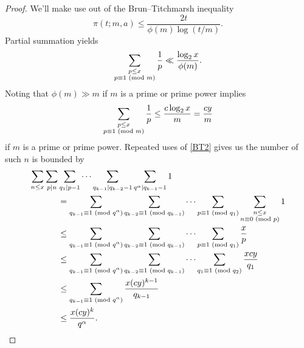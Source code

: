 \documentclass[12pt,regno]{amsart}
\begin{document}
\begin{proof}
We'll make use out of the Brun--Titchmarsh inequality
$$\pi(t;m,a)\le \frac{2t}{\phi(m)\log(t/m)}.$$ Partial summation yields
\begin{equation}\label{BT}
\sum_{\substack{p \le x \\ p \equiv 1 {{\ifmmode\text{\rm\ (mod~${m}$)}\else\discretionary{}{}{\hbox{ }}\rm(mod~${m}$)\fi}}}}\frac{1}{p} \ll \frac{\log_2 x}{\phi(m)}.
\end{equation} Noting that $\phi(m) \gg m$ if $m$ is a prime or prime power implies
\begin{equation}\label{BT2}
\sum_{\substack{p \le x \\ p \equiv 1 {{\ifmmode\text{\rm\ (mod~${m}$)}\else\discretionary{}{}{\hbox{ }}\rm(mod~${m}$)\fi}}}}\frac{1}{p} \le \frac{c\log_2 x}{m} = \frac{cy}{m}
\end{equation} if $m$ is a prime or prime power. Repeated uses of \eqref{BT2} gives us the number of such $n$ is bounded by
\begin{align*}
\sum_{n \le x}\sum_{p \mid n}& \sum_{q_1 \mid p-1}\dots \sum_{q_{k-1} \mid q_{k-2}-1}\sum_{q^{\alpha} \mid q_{k-1}-1}1 \\ & = \sum_{q_{k-1}\equiv 1{{\ifmmode\text{\rm\ (mod~${q^{\alpha}}$)}\else\discretionary{}{}{\hbox{ }}\rm(mod~${q^{\alpha}}$)\fi}}}\sum_{q_{k-2}\equiv 1{{\ifmmode\text{\rm\ (mod~${q_{k-1}}$)}\else\discretionary{}{}{\hbox{ }}\rm(mod~${q_{k-1}}$)\fi}}}\dots\sum_{p \equiv 1 {{\ifmmode\text{\rm\ (mod~${q_1}$)}\else\discretionary{}{}{\hbox{ }}\rm(mod~${q_1}$)\fi}}}\sum_{\substack{n \le x \\ n \equiv 0 {{\ifmmode\text{\rm\ (mod~${p}$)}\else\discretionary{}{}{\hbox{ }}\rm(mod~${p}$)\fi}}}}1 \\
& \le \sum_{q_{k-1}\equiv 1{{\ifmmode\text{\rm\ (mod~${q^{\alpha}}$)}\else\discretionary{}{}{\hbox{ }}\rm(mod~${q^{\alpha}}$)\fi}}}\sum_{q_{k-2}\equiv 1{{\ifmmode\text{\rm\ (mod~${q_{k-1}}$)}\else\discretionary{}{}{\hbox{ }}\rm(mod~${q_{k-1}}$)\fi}}}\dots\sum_{p \equiv 1 {{\ifmmode\text{\rm\ (mod~${q_1}$)}\else\discretionary{}{}{\hbox{ }}\rm(mod~${q_1}$)\fi}}}\frac{x}{p} \\
& \le \sum_{q_{k-1}\equiv 1{{\ifmmode\text{\rm\ (mod~${q^{\alpha}}$)}\else\discretionary{}{}{\hbox{ }}\rm(mod~${q^{\alpha}}$)\fi}}}\sum_{q_{k-2}\equiv 1{{\ifmmode\text{\rm\ (mod~${q_{k-1}}$)}\else\discretionary{}{}{\hbox{ }}\rm(mod~${q_{k-1}}$)\fi}}}\dots\sum_{q_1 \equiv 1 {{\ifmmode\text{\rm\ (mod~${q_2}$)}\else\discretionary{}{}{\hbox{ }}\rm(mod~${q_2}$)\fi}}}\frac{xcy}{q_1} \\
& \le \sum_{q_{k-1}\equiv 1{{\ifmmode\text{\rm\ (mod~${q^{\alpha}}$)}\else\discretionary{}{}{\hbox{ }}\rm(mod~${q^{\alpha}}$)\fi}}}\frac{x(cy)^{k-1}}{q_{k-1}} \\
& \le \frac{x(cy)^{k}}{q^{\alpha}}.
\end{align*}
\end{proof}
\end{document}
